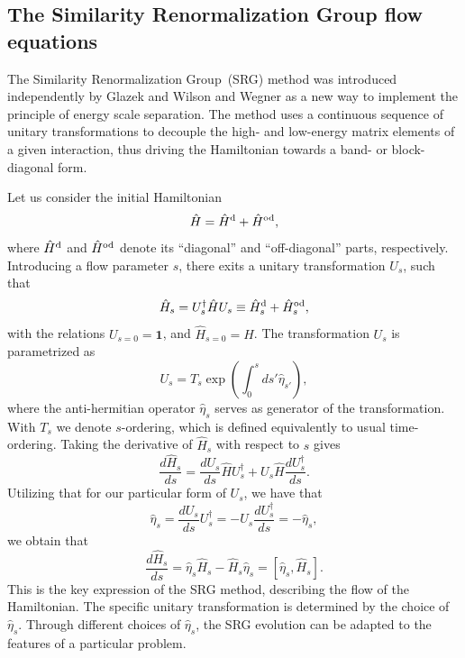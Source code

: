 \documentclass[aps,twocolumn,showpacs,floatfix,nofootinbib,preprintnumbers,superscriptaddress,amsmath,amssymb]{revtex4-1}
\newcommand{\Ho}{\hat{H}^{\rm od}}
\begin{document}
\subsection{The Similarity Renormalization Group flow equations}
\label{subsec:SRG}
The Similarity Renormalization Group~(SRG) method was introduced
independently by Glazek and Wilson
\cite{PhysRevD.48.5863,*PhysRevD.49.4214} and Wegner
\cite{PhysRepWegner0,*PhysRepWegner} as a new way to implement the
principle of energy scale separation.  The method uses a continuous
sequence of unitary transformations to decouple the high- and
low-energy matrix elements of a given interaction, thus driving the
Hamiltonian towards a band- or block-diagonal form.

Let us consider the initial Hamiltonian
\[
 \hat{H} = \hat{H}^{\rm d} + \Ho,
\]
where $\hat{H}^{\rm d}$ and $\Ho$ denote its ``diagonal'' and
``off-diagonal'' parts, respectively.
 Introducing a flow parameter $s$, there exits a unitary
 transformation $U_s$, such that
\begin{equation}
 \hat{H}_s = U_s^\dagger \hat{H} U_s \equiv \hat{H}^{\rm d}_s + \Ho_s,
\end{equation}
with the relations $U_{s=0} = \mathbf{1}$, and $\hat{H}_{s= 0} =\hat{H}$.  
The transformation $U_s$ is parametrized as
\[
U_s = T_s \exp \left(\int_0^s \! ds'\hat{\eta}_{s'} \right),
\]
where the anti-hermitian operator $\hat{\eta}_s$ serves as generator
of the transformation. With $T_s$ we denote $s$-ordering, which is
defined equivalently to usual time-ordering.  Taking the derivative of
$\hat{H}_s$ with respect to $s$ gives
\begin{equation}
 \frac{d \hat{H}_s}{ds} = \frac{d U_s}{ds}\hat{H} U_s^\dagger + U_s
 \hat{H} \frac{d U_s^\dagger}{ds}.
\label{eq:flow_long}
\end{equation}
Utilizing that for our particular form of $U_s$, we have that 
\begin{equation}
\hat{\eta}_s = \frac{d U_s}{ds} U_s^\dagger = - U_s \frac{d
  U_s^\dagger}{ds} = -\hat{\eta}_s,
\label{eq:eta}
\end{equation} we obtain that 
\begin{equation} \frac{d \hat{H}_s}{ds} = \hat{\eta}_s \hat{H}_s
- \hat{H}_s \hat{\eta}_s = \left[\hat{\eta}_s, \hat{H}_s \right].
\label{eq:flowEquations}
\end{equation} This is the key expression of the SRG method, describing the flow
of the Hamiltonian.  The specific unitary transformation is determined
by the choice of $\hat{\eta}_s$.  Through different choices of
$\hat{\eta}_s$, the SRG evolution can be adapted to the features of a
particular problem.\\
\end{document}
